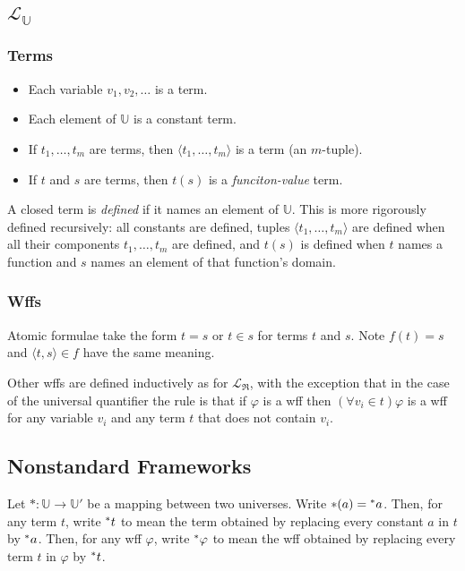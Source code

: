 \documentclass{article}
\newcommand{\hr}[1]{\prescript{*}{}{#1}}
\begin{document}
\subsection{$\mathcal{L}_\mathbb{U}$}
\subsubsection{Terms}
\begin{itemize}
    \item Each variable $v_1, v_2, \ldots$ is a term.
    \item Each element of $\mathbb{U}$ is a constant term.
    \item If $t_1, \ldots, t_m$ are terms, then $\langle t_1, \ldots, t_m \rangle$ is a term (an $m$-tuple).
    \item If $t$ and $s$ are terms, then $t(s)$ is a \textit{funciton-value} term.
\end{itemize}

A closed term is \textit{defined} if it names an element of $\mathbb{U}$. This is more rigorously defined recursively: all constants are defined, tuples $\langle t_1, \ldots, t_m \rangle$ are defined when all their components $t_1, \ldots, t_m$ are defined, and $t(s)$ is defined when $t$ names a function and $s$ names an element of that function's domain. 

\subsubsection{Wffs}
Atomic formulae take the form $t = s$ or $t \in s$ for terms $t$ and $s$. Note $f(t) = s$ and $\langle t, s \rangle \in f$ have the same meaning.

Other wffs are defined inductively as for $\mathcal{L}_\mathfrak{R}$, with the exception that in the case of the universal quantifier the rule is that if $\varphi$ is a wff then $(\forall v_i \in t) \varphi$ is a wff for any variable $v_i$ and any term $t$ that does not contain $v_i$.

\subsection{Nonstandard Frameworks}
Let $\ast: \mathbb{U} \to \mathbb{U}'$ be a mapping between two universes. Write $\ast(a) = \hr{a}$. Then, for any term $t$, write $\hr{t}$ to mean the term obtained by replacing every constant $a$ in $t$ by $\hr{a}$. Then, for any wff $\varphi$, write $\hr{\varphi}$ to mean the wff obtained by replacing every term $t$ in $\varphi$ by $\hr{t}$.
\end{document}

